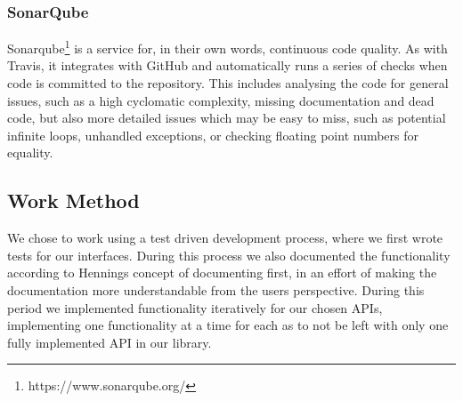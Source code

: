 \documentclass{sigchi-alternate}
\begin{document}
\subsubsection{SonarQube}
Sonarqube\footnote{https://www.sonarqube.org/} is a service for, in their own words, continuous code quality. As with Travis, it integrates with GitHub and automatically runs a series of
checks when code is committed to the repository. This includes analysing the code for general issues, such as a high cyclomatic complexity, missing documentation and dead code, but also
more detailed issues which may be easy to miss, such as potential infinite loops, unhandled exceptions, or checking floating point numbers for equality.

\subsection{Work Method}
We chose to work using a test driven development process, where we first wrote tests for our interfaces. During this process we also documented the functionality according to 
Hennings\autocite{Henning:2007:ADM:1255421.1255422} concept of documenting first, in an effort of making the documentation more understandable from the users perspective. During this
period we implemented functionality iteratively for our chosen APIs, implementing one functionality at a time for each as to not be left with only one fully implemented API in our library.
\end{document}
